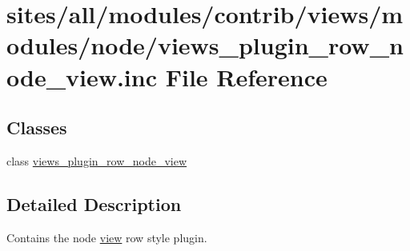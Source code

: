 \hypertarget{views__plugin__row__node__view_8inc}{
\section{sites/all/modules/contrib/views/modules/node/views\_\-plugin\_\-row\_\-node\_\-view.inc File Reference}
\label{views__plugin__row__node__view_8inc}
}
\subsection*{Classes}
\begin{CompactItemize}
\item 
class \hyperlink{classviews__plugin__row__node__view}{views\_\-plugin\_\-row\_\-node\_\-view}
\end{CompactItemize}


\subsection{Detailed Description}
Contains the node \hyperlink{classview}{view} row style plugin. 